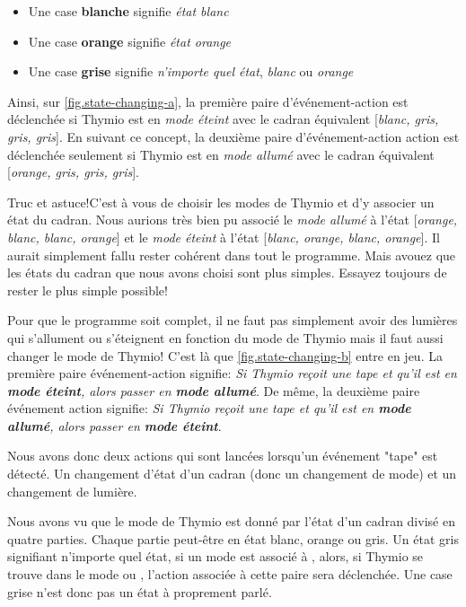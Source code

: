 \begin{itemize}
	\item Une case \textbf{blanche} signifie \textit{état blanc}
	\item Une case \textbf{orange} signifie \textit{état orange}
	\item Une case \textbf{grise} signifie \textit{n'importe quel état}, \textit{blanc} ou \textit{orange}
\end{itemize}

Ainsi, sur \cref{fig.state-changing-a}, la première paire d'événement-action est déclenchée si Thymio est en \textit{mode éteint} avec le cadran équivalent [\textit{blanc, gris, gris, gris}]. En suivant ce concept, la deuxième paire d'événement-action action est déclenchée seulement si Thymio est en \textit{mode allumé} avec le cadran équivalent [\textit{orange, gris, gris, gris}]. 

\begin{bclogo}[couleur = blue!30, arrondi = 0.1, logo = \bcinfo, ombre = true]{Truc et astuce!}C'est à vous de choisir les modes de Thymio et d'y associer un état du cadran. Nous aurions très bien pu associé le \textit{mode allumé} à l'état  [\textit{orange, blanc, blanc, orange}] et le \textit{mode éteint} à l'état [\textit{blanc, orange, blanc, orange}]. Il aurait simplement fallu rester cohérent dans tout le programme. Mais avouez que les états du cadran que nous avons choisi sont plus simples. Essayez toujours de rester le plus simple possible!
\end{bclogo}

Pour que le programme soit complet, il ne faut pas simplement avoir des lumières qui s'allument ou s'éteignent en fonction du mode de Thymio mais il faut aussi changer le mode de Thymio! C'est là que \cref{fig.state-changing-b} entre en jeu. La première paire événement-action signifie: \textit{Si Thymio reçoit une tape et qu'il est en \textbf{mode éteint}, alors passer en \textbf{mode allumé}}. De même, la deuxième paire événement action signifie: \textit{Si Thymio reçoit une tape et qu'il est en \textbf{mode allumé}, alors passer en \textbf{mode éteint}}.

Nous avons donc deux actions qui sont lancées lorsqu'un événement "tape" est détecté. Un changement d'état d'un cadran (donc un changement de mode) et un changement de lumière.


Nous avons vu que le mode de Thymio est donné par l'état d'un cadran divisé en quatre parties. Chaque partie peut-être en état blanc, orange ou gris. Un état gris signifiant n'importe quel état, si un mode est associé à , alors, si Thymio se trouve dans le mode  ou , l'action associée à cette paire sera déclenchée. Une case grise n'est donc pas un état à proprement parlé.

